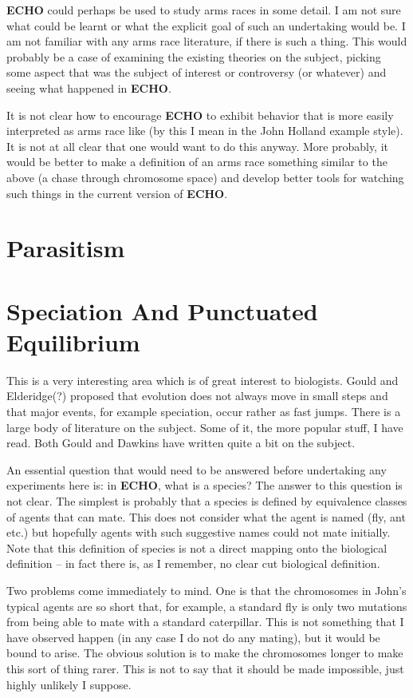 {\bf ECHO} could perhaps be used to study arms races in some detail. I
am not sure what could be learnt or what the explicit goal of such an
undertaking would be. I am not familiar with any arms race literature,
if there is such a thing. This would probably be a case of examining
the existing theories on the subject, picking some aspect that was the
subject of interest or controversy (or whatever) and seeing what
happened in {\bf ECHO}.

It is not clear how to encourage {\bf ECHO} to exhibit behavior that
is more easily interpreted as arms race like (by this I mean in the
John Holland example style). It is not at all clear that one would
want to do this anyway. More probably, it would be better to make a
definition of an arms race something similar to the above (a chase
through chromosome space) and develop better tools for watching such
things in the current version of {\bf ECHO}.

\section{Parasitism}

\section{Speciation And Punctuated Equilibrium}

This is a very interesting area which is of great interest to
biologists. Gould and Elderidge(?) proposed that evolution does not
always move in small steps and that major events, for example
speciation, occur rather as fast jumps. There is a large body of
literature on the subject. Some of it, the more popular stuff, I have
read. Both Gould and Dawkins have written quite a bit on the subject.

An essential question that would need to be answered before
undertaking any experiments here is: in {\bf ECHO}, what is a species?
The answer to this question is not clear. The simplest is probably
that a species is defined by equivalence classes of agents that can
mate. This does not consider what the agent is named (fly, ant etc.)
but hopefully agents with such suggestive names could not mate
initially. Note that this definition of species is not a direct
mapping onto the biological definition -- in fact there is, as I
remember, no clear cut biological definition.

Two problems come immediately to mind. One is that the chromosomes in
John's typical agents are so short that, for example, a standard fly
is only two mutations from being able to mate with a standard
caterpillar. This is not something that I have observed happen (in any
case I do not do any mating), but it would be bound to arise. The
obvious solution is to make the chromosomes longer to make this sort
of thing rarer. This is not to say that it should be made impossible,
just highly unlikely I suppose.

